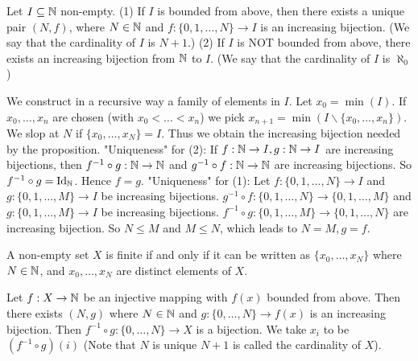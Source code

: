 \documentclass{book}
\numberwithin{equation}{section}
\begin{document}
\begin{propositionenv}
    Let $I\subseteq \mathbb{N}$ non-empty.
    \newline
    (1) If $I$ is bounded from above, then there exists a unique pair $(N,f)$, where $N\in \mathbb{N}$ and $f:\{0,1,\dots,N\}\rightarrow I$ is an increasing bijection. (We say that the cardinality of $I$ is $N+1$.)
    \newline
    (2) If $I$ is NOT bounded from above, there exists an increasing bijection from $\mathbb{N}$ to $I$. (We say that the cardinality of $I$ is $\aleph_0$) 
\end{propositionenv}
\begin{proofenv}
    \quad
    \newline
    We construct in a recursive way a family of elements in $I$. Let $x_0=\min(I)$. If $x_0,\dots ,x_n$ are chosen (with $x_0<\dots<x_n$) we pick $x_{n+1}=\min(I\backslash\{x_0,\dots,x_n\})$. We slop at $N$ if $\{x_0,\dots,x_N\}=I$. Thus we obtain the increasing bijection needed by the proposition.
    \newline
    "Uniqueness" for (2): If $f:\mathbb{N}\rightarrow I,g:\mathbb{N}\rightarrow I$ are increasing bijections, then $f^{-1}\circ g:\mathbb{N}\rightarrow\mathbb{N}$ and $g^{-1}\circ f:\mathbb{N}\rightarrow\mathbb{N}$ are increasing bijections. So $f^{-1}\circ g=\mathrm{Id}_{\mathbb{N}}$. Hence $f=g$.
    \newline
    "Uniqueness" for (1): Let $f:\{0,1,\dots,N\}\rightarrow I$ and $g:\{0,1,\dots,M\}\rightarrow I$ be increasing bijections. $g^{-1}\circ f:\{0,1,\dots,N\}\rightarrow \{0,1,\dots, M\}$ and $g:\{0,1,\dots,M\}\rightarrow I$ be increasing bijections. $f^{-1}\circ g:\{0,1,\dots,M\}\rightarrow \{0,1,\dots, N\}$ are increasing bijection. So $N\le M$ and $M\le N$, which leads to $N=M,g=f$. 
\end{proofenv}
\begin{corollaryenv}
    A non-empty set $X$ is finite if and only if it can be written as $\{x_0,\dots,x_N\}$ where $N\in \mathbb{N}$, and $x_0,\dots,x_N$ are distinct elements of $X$.
\end{corollaryenv}
\begin{proofenv}
    Let $f:X\rightarrow \mathbb{N}$ be an injective mapping with $f(x)$ bounded from above. Then there exists $(N,g)$ where $N\in \mathbb{N}$ and $g:\{0,\dots ,N\}\rightarrow f(x)$ is an increasing bijection. Then $f^{-1}\circ g:\{0,\dots,N\}\rightarrow X$ is a bijection. We take $x_i$ to be $(f^{-1}\circ g)(i)$ (Note that $N$ is unique $N+1$ is called the cardinality of $X$).
\end{proofenv}
\end{document}
